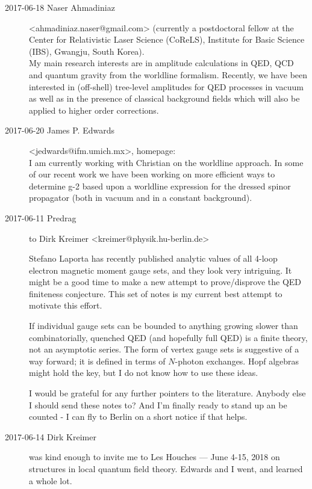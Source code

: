 \begin{description}
\item[2017-06-18 Naser Ahmadiniaz] <ahmadiniaz.naser@gmail.com>
(currently a postdoctoral fellow at the Center for Relativistic Laser
Science (CoReLS), Institute for Basic Science (IBS), Gwangju, South
Korea).
\\
My main research
interests are in amplitude calculations in QED, QCD and quantum gravity
from the worldline formalism. Recently, we have been interested in
(off-shell) tree-level amplitudes for QED processes in vacuum as well as
in the presence of classical background fields which will also be applied
to higher order corrections.

\item[2017-06-20 James P. Edwards] <jedwards@ifm.umich.mx>,
{homepage}:
\\
I am currently working with Christian on the worldline approach. In some
of our recent work we have been working on more efficient ways to
determine g-2 based upon a worldline expression for the dressed spinor
propagator (both in vacuum and in a constant background).

\item[2017-06-11 Predrag] to
Dirk Kreimer <kreimer@physik.hu-berlin.de>
%
%

Stefano Laporta  has recently published analytic values of all 4-loop
electron magnetic moment gauge sets, and they look very intriguing.
It might be a good time to make a new attempt to prove/disprove
the QED finiteness conjecture. This set of notes is my current best attempt
to motivate this effort.

If individual gauge sets can be bounded to anything growing slower than
combinatorially, quenched QED (and hopefully full QED) is a finite
theory, not an asymptotic series. The form of vertex gauge sets is
suggestive of a way forward; it is defined in terms of $N$-photon
exchanges. Hopf algebras might hold the key, but I do not know how to use
these ideas.

I would be grateful for any further pointers to the literature.
Anybody else I should send these notes to? And I'm
finally ready to stand up an be counted - I can fly to Berlin on a short
notice if that helps.

%

\item[2017-06-14 Dirk Kreimer] was kind enough to invite me to
{Les Houches — June 4-15, 2018} on structures in local quantum field
theory. Edwards and I went, and learned a whole lot.

\end{description}

